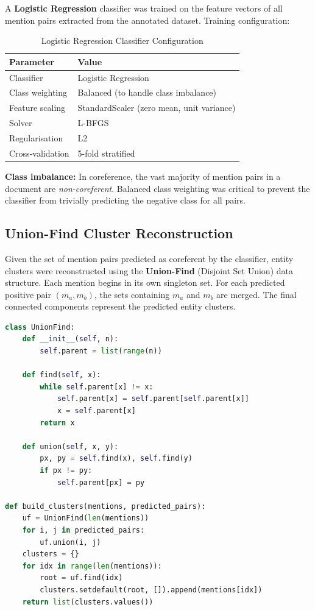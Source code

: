 \documentclass[12pt,a4paper]{report}
\begin{document}
A \textbf{Logistic Regression} classifier was trained on the feature vectors of all mention pairs extracted from the annotated dataset. Training configuration:

\begin{table}[H]
\centering
\caption{Logistic Regression Classifier Configuration}
\begin{tabular}{|l|l|}
\hline
\textbf{Parameter} & \textbf{Value} \\
\hline
Classifier & Logistic Regression \\
Class weighting & Balanced (to handle class imbalance) \\
Feature scaling & StandardScaler (zero mean, unit variance) \\
Solver & L-BFGS \\
Regularisation & L2 \\
Cross-validation & 5-fold stratified \\
\hline
\end{tabular}
\end{table}

\noindent \textbf{Class imbalance:} In coreference, the vast majority of mention pairs in a document are \textit{non-coreferent}. Balanced class weighting was critical to prevent the classifier from trivially predicting the negative class for all pairs.

\subsection{Union-Find Cluster Reconstruction}

Given the set of mention pairs predicted as coreferent by the classifier, entity clusters were reconstructed using the \textbf{Union-Find} (Disjoint Set Union) data structure. Each mention begins in its own singleton set. For each predicted positive pair $(m_a, m_b)$, the sets containing $m_a$ and $m_b$ are merged. The final connected components represent the predicted entity clusters.

\begin{lstlisting}[language=Python, caption={Union-Find Cluster Reconstruction}]
class UnionFind:
    def __init__(self, n):
        self.parent = list(range(n))

    def find(self, x):
        while self.parent[x] != x:
            self.parent[x] = self.parent[self.parent[x]]
            x = self.parent[x]
        return x

    def union(self, x, y):
        px, py = self.find(x), self.find(y)
        if px != py:
            self.parent[px] = py

def build_clusters(mentions, predicted_pairs):
    uf = UnionFind(len(mentions))
    for i, j in predicted_pairs:
        uf.union(i, j)
    clusters = {}
    for idx in range(len(mentions)):
        root = uf.find(idx)
        clusters.setdefault(root, []).append(mentions[idx])
    return list(clusters.values())
\end{lstlisting}
\end{document}
